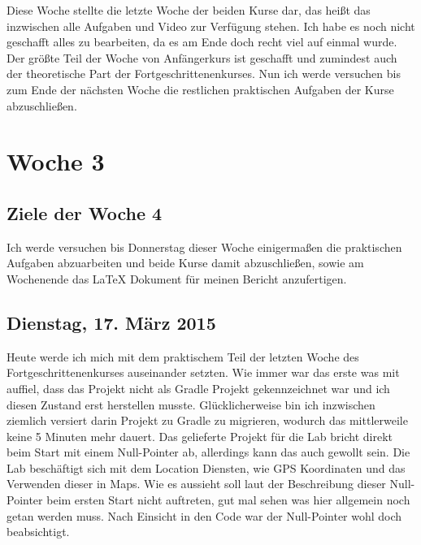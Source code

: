\documentclass[12pt,a4paper,bibliography=totocnumbered,listof=totocnumbered]{scrartcl}
\begin{document}
Diese Woche stellte die letzte Woche der beiden Kurse dar, das heißt das inzwischen alle Aufgaben und Video zur Verfügung stehen. Ich habe es noch nicht geschafft alles zu bearbeiten, da es am Ende doch recht viel auf einmal wurde. Der größte Teil der Woche von Anfängerkurs ist geschafft und zumindest auch der theoretische Part der Fortgeschrittenenkurses. Nun ich werde versuchen bis zum Ende der nächsten Woche die restlichen praktischen Aufgaben der Kurse abzuschließen.

\pagebreak

\section{Woche 3}

\subsection{Ziele der Woche 4}

Ich werde  versuchen bis Donnerstag dieser Woche einigermaßen die praktischen Aufgaben abzuarbeiten und beide Kurse damit abzuschließen, sowie am Wochenende das LaTeX Dokument für meinen Bericht anzufertigen. 

\subsection{Dienstag, 17. März 2015}

Heute werde ich mich mit dem praktischem Teil der letzten Woche des Fortgeschrittenenkurses auseinander setzten. 
Wie immer war das erste was mit auffiel, dass das Projekt nicht als Gradle Projekt gekennzeichnet war und ich diesen Zustand erst herstellen musste. Glücklicherweise bin ich inzwischen ziemlich versiert darin Projekt zu Gradle zu migrieren, wodurch das mittlerweile keine 5 Minuten mehr dauert. 
Das gelieferte Projekt für die Lab bricht direkt beim Start mit einem Null-Pointer ab, allerdings kann das auch gewollt sein. Die Lab beschäftigt sich mit dem Location Diensten, wie GPS Koordinaten und das Verwenden dieser in Maps. Wie es aussieht soll laut der Beschreibung dieser Null-Pointer beim ersten Start nicht auftreten, gut mal sehen was hier allgemein noch getan werden muss. 
Nach Einsicht in den Code war der Null-Pointer wohl doch beabsichtigt. 
\end{document}
